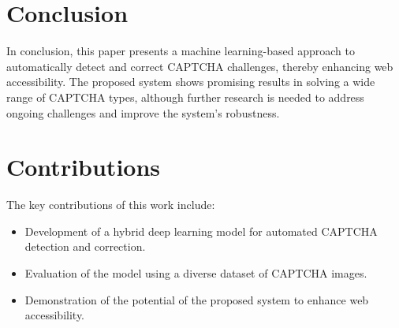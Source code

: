 \documentclass{article}
\begin{document}
\section{Conclusion}
In conclusion, this paper presents a machine learning-based approach to automatically detect and correct CAPTCHA challenges, thereby enhancing web accessibility. The proposed system shows promising results in solving a wide range of CAPTCHA types, although further research is needed to address ongoing challenges and improve the system's robustness.

\section{Contributions}
The key contributions of this work include:
\begin{itemize}
    \item Development of a hybrid deep learning model for automated CAPTCHA detection and correction.
    \item Evaluation of the model using a diverse dataset of CAPTCHA images.
    \item Demonstration of the potential of the proposed system to enhance web accessibility.
\end{itemize}
\end{document}
